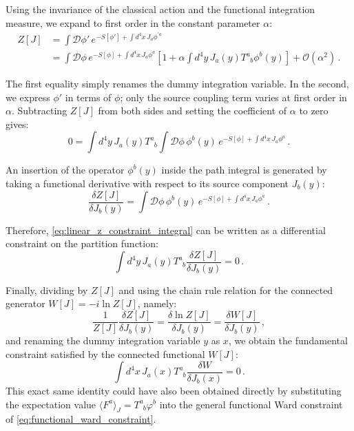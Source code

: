 Using the invariance of the classical action and the functional integration measure, we expand to first order in the constant parameter \(\alpha\):
\begin{equation} \label{eq:z_linear_expansion}
    \begin{aligned}
        Z[J] & = \int \mathcal{D}\phi' \, e^{-S[\phi'] + \int d^4x \, J_a \phi^{\prime a}}                                                                                             \\
             & = \int \mathcal{D}\phi \, e^{-S[\phi] + \int d^4x \, J_a \phi^a} \left[ 1 + \alpha \int d^4y \, J_a(y) T^a_{\phantom{a}b}\phi^b(y) \right] + \mathcal{O}(\alpha^2) \, .
    \end{aligned}
\end{equation}

The first equality simply renames the dummy integration variable. In the second, we express \(\phi'\) in terms of \(\phi\); only the source coupling term varies at first order in \(\alpha\). Subtracting \(Z[J]\) from both sides and setting the coefficient of \(\alpha\) to zero gives:
\begin{equation} \label{eq:linear_z_constraint_integral}
    0 = \int d^4y \, J_a(y) T^a_{\phantom{a}b} \int \mathcal{D}\phi \, \phi^b(y) \, e^{-S[\phi] + \int d^4x \, J_a \phi^a} \, .
\end{equation}

An insertion of the operator \(\phi^b(y)\) inside the path integral is generated by taking a functional derivative with respect to its source component \(J_b(y)\):
\begin{equation} \label{eq:source_derivative_phi}
    \frac{\delta Z[J]}{\delta J_b(y)} = \int \mathcal{D}\phi \, \phi^b(y) \, e^{-S[\phi] + \int d^4x \, J_a \phi^a} \, .
\end{equation}

Therefore, \eqref{eq:linear_z_constraint_integral} can be written as a differential constraint on the partition function:
\begin{equation} \label{eq:linear_z_differential}
    \int d^4y \, J_a(y) T^a_{\phantom{a}b} \frac{\delta Z[J]}{\delta J_b(y)} = 0 \, .
\end{equation}

Finally, dividing by \(Z[J]\) and using the chain rule relation for the connected generator \(W[J] = -i \ln Z[J]\), namely:
\begin{equation} \label{eq:z_to_w_derivative_relation}
    \frac{1}{Z[J]} \frac{\delta Z[J]}{\delta J_b(y)} = \frac{\delta \ln Z[J]}{\delta J_b(y)} = \frac{\delta W[J]}{\delta J_b(y)} \, ,
\end{equation}
and renaming the dummy integration variable \(y\) as \(x\), we obtain the fundamental constraint satisfied by the connected functional \(W[J]\):
\begin{equation} \label{eq:linear_ward_W}
    \boxed{\int d^4x \, J_a(x) T^a_{\phantom{a}b} \frac{\delta W}{\delta J_b(x)} = 0} \, .
\end{equation}
This exact same identity could have also been obtained directly by substituting the expectation value \(\langle F^a \rangle_J = T^a_{\phantom{a}b}\varphi^b\) into the general functional Ward constraint of \eqref{eq:functional_ward_constraint}.

